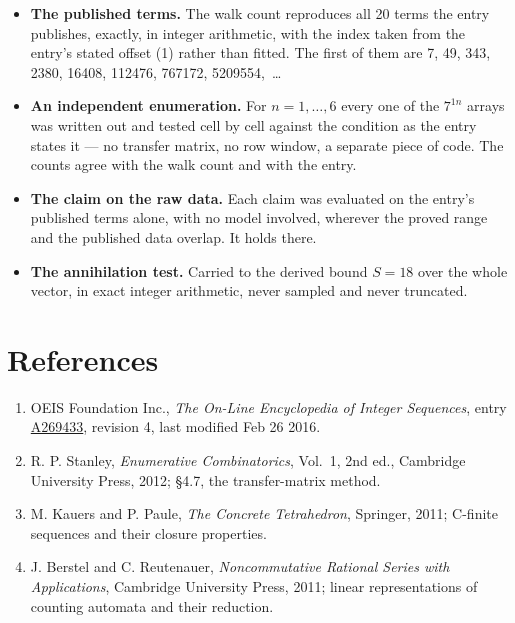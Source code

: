 \documentclass[11pt]{article}
\theoremstyle{definition}
\begin{document}
\begin{itemize}

\item {\bfseries The published terms.} The walk count reproduces all 20 terms the entry publishes, exactly, in integer arithmetic, with the index taken from the entry's stated offset (1) rather than fitted. The first of them are 7, 49, 343, 2380, 16408, 112476, 767172, 5209554,~\dots

\item {\bfseries An independent enumeration.} For $n = 1,\dots,6$ every one of the $7^{1n}$ arrays was written out and tested cell by cell against the condition as the entry states it --- no transfer matrix, no row window, a separate piece of code. The counts agree with the walk count and with the entry.

\item {\bfseries The claim on the raw data.} Each claim was evaluated on the entry's published terms alone, with no model involved, wherever the proved range and the published data overlap. It holds there.

\item {\bfseries The annihilation test.} Carried to the derived bound $S = 18$ over the whole vector, in exact integer arithmetic, never sampled and never truncated.

\end{itemize}

\section{References}

\begin{enumerate}

\item OEIS Foundation Inc., \emph{The On-Line Encyclopedia of Integer Sequences}, entry \href{https://oeis.org/A269433}{A269433}, revision 4, last modified Feb 26 2016.

\item R. P. Stanley, \emph{Enumerative Combinatorics}, Vol.~1, 2nd ed., Cambridge University Press, 2012; \S4.7, the transfer-matrix method.

\item M. Kauers and P. Paule, \emph{The Concrete Tetrahedron}, Springer, 2011; C-finite sequences and their closure properties.

\item J. Berstel and C. Reutenauer, \emph{Noncommutative Rational Series with Applications}, Cambridge University Press, 2011; linear representations of counting automata and their reduction.

\end{enumerate}
\end{document}
